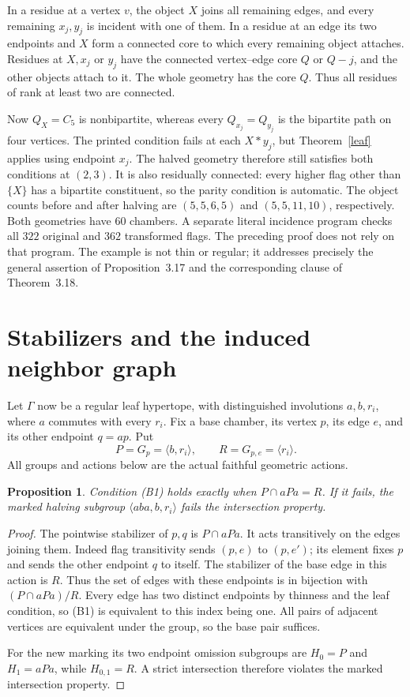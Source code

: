 \documentclass[11pt,a4paper]{article}
\newtheorem{proposition}[theorem]{Proposition}
\newcommand{\gen}[1]{\langle#1\rangle}
\begin{document}
In a residue at a vertex $v$, the object $X$ joins all remaining
edges, and every remaining $x_j,y_j$ is incident with one of them.
In a residue at an edge its two endpoints and $X$ form a connected
core to which every remaining object attaches. Residues at $X,x_j$
or $y_j$ have the connected vertex--edge core $Q$ or $Q-j$, and
the other objects attach to it. The whole geometry has the core
$Q$. Thus all residues of rank at least two are connected.

Now $Q_X=C_5$ is nonbipartite, whereas every $Q_{x_j}=Q_{y_j}$
is the bipartite path on four vertices. The printed condition fails
at each $X*y_j$, but Theorem~\ref{leaf} applies using endpoint $x_j$.
The halved geometry therefore still satisfies both conditions at
$(2,3)$. It is also residually connected: every higher flag other
than $\{X\}$ has a bipartite constituent, so the parity condition
is automatic. The object counts before and after halving are
$(5,5,6,5)$ and $(5,5,11,10)$, respectively. Both geometries have
$60$ chambers. A separate literal incidence program checks all
$322$ original and $362$ transformed flags. The preceding proof
does not rely on that program. The example is not thin or regular;
it addresses precisely the general assertion of Proposition~3.17
and the corresponding clause of Theorem~3.18.

\section{Stabilizers and the induced neighbor graph}
Let $\Gamma$ now be a regular leaf hypertope, with distinguished
involutions $a,b,r_i$, where $a$ commutes with every $r_i$. Fix a
base chamber, its vertex $p$, its edge $e$, and its other endpoint
$q=ap$. Put
\[
 P=G_p=\gen{b,r_i},\qquad R=G_{p,e}=\gen{r_i}.
\]
All groups and actions below are the actual faithful geometric actions.

\begin{proposition}\label{stabilizer}
Condition (B1) holds exactly when $P\cap aPa=R$. If it fails,
the marked halving subgroup $\gen{aba,b,r_i}$ fails the intersection
property.
\end{proposition}
\begin{proof}
The pointwise stabilizer of $p,q$ is $P\cap aPa$. It acts
transitively on the edges joining them. Indeed flag transitivity
sends $(p,e)$ to $(p,e')$; its element fixes $p$ and sends the
other endpoint $q$ to itself. The stabilizer of the base edge in
this action is $R$. Thus the set of edges with these endpoints
is in bijection with $(P\cap aPa)/R$. Every edge has two distinct
endpoints by thinness and the leaf condition, so (B1) is equivalent
to this index being one. All pairs of adjacent vertices are
equivalent under the group, so the base pair suffices.

For the new marking its two endpoint omission subgroups are
$H_0=P$ and $H_1=aPa$, while $H_{0,1}=R$. A strict intersection
therefore violates the marked intersection property.
\end{proof}
\end{document}
